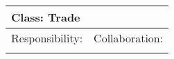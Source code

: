 \vspace{0.4cm}
\begin{tabular}{|p{7cm}|p{7cm}|} \hline
\multicolumn{2}{|l|}{Class:  Trade} \\ \hline
Responsibility:  & Collaboration:  \\ \hline
 &  \\ 
\hline
\end{tabular}
\vspace{0.8cm}
